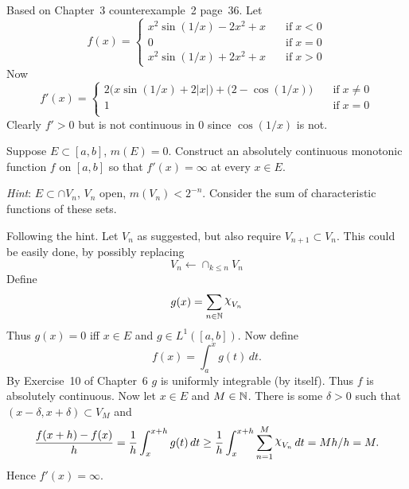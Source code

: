 \begin{enumerate}
Based on \cite{Gelb1996} Chapter~3 counterexample~2 page~36. Let
\begin{equation*}
f(x) = \left\{
\begin{array}{ll}
x^2\sin(1/x) - 2x^2 + x \quad & \mathrm{if}\; x < 0 \\
0            \quad & \mathrm{if}\; x =  0 \\
x^2\sin(1/x) + 2x^2 + x \quad & \mathrm{if}\; x > 0
\end{array}
\right.
\end{equation*}
Now
\begin{equation*}
f'(x) = \left\{
\begin{array}{ll}
2\bigl(x\sin(1/x) + 2|x|\bigr) + \bigl(2-\cos(1/x)\bigr)
    \quad & \mathrm{if}\; x\neq 0 \\
1   \quad & \mathrm{if}\; x=0 \\
\end{array}
\right.
\end{equation*}
Clearly \(f'>0\) but is not continuous in $0$ since \(\cos(1/x)\) is not.


\begin{excopy}
Suppose \(E\subset [a,b]\), \(m(E)=0\).
Construct an absolutely continuous monotonic function $f$ on \([a,b]\)
so that \(f'(x)=\infty\) at every \(x\in E\).

\emph{Hint}: \(E \subset \cap V_n\), \(V_n\) open, \(m(V_n)<2^{-n}\).
Consider the sum of characteristic functions of these sets.
\end{excopy}

Following the hint.
Let \(V_n\) as suggested, but also require \(V_{n+1}\subset V_n\).
This could be easily done, by possibly replacing
\begin{equation*}
V_n \leftarrow \cap_{k\leq n} V_n
\end{equation*}
Define
\begin{equation*}
g(x) = \sum_{n\in\N} \chhi_{V_n}
\end{equation*}
Thus \(g(x)=0\) iff \(x\in E\) and \(g\in L^1([a,b])\).
Now define
\begin{equation*}
f(x) = \int_a^x g(t)\,dt.
\end{equation*}
By Exercise~10 of Chapter~6 \cite{RudinRCA87}
$g$ is uniformly integrable (by itself).
Thus $f$ is absolutely continuous.
Now let \(x\in E\) and \(M\in\mathbb{N}\).
There is some \(\delta>0\) such that
\((x-\delta,x+\delta) \subset V_M\) and 
\begin{equation*}
\frac{f(x+h) - f(x)}{h} 
= \frac{1}{h}\int_x^{x+h} g(t)\,dt
\geq \frac{1}{h}\int_x^{x+h} \sum_{n=1}^M \chhi_{V_n}\,dt
= Mh/h = M.
\end{equation*}
Hence \(f'(x)=\infty\).




\end{enumerate}
